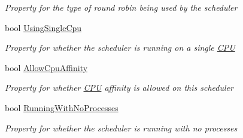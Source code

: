 \begin{DoxyCompactItemize}
\begin{DoxyCompactList}\small\item\em Property for the type of round robin being used by the scheduler \end{DoxyCompactList}\item 
bool \hyperlink{class_c_p_u___o_s___simulator_1_1_operating___system_1_1_scheduler_a3637999160bc25da430731042f42dd81}{Using\+Single\+Cpu}
\begin{DoxyCompactList}\small\item\em Property for whether the scheduler is running on a single \hyperlink{namespace_c_p_u___o_s___simulator_1_1_c_p_u}{C\+P\+U} \end{DoxyCompactList}\item 
bool \hyperlink{class_c_p_u___o_s___simulator_1_1_operating___system_1_1_scheduler_a904a19345a3ceffa809aac3e0ad06321}{Allow\+Cpu\+Affinity}
\begin{DoxyCompactList}\small\item\em Property for whether \hyperlink{namespace_c_p_u___o_s___simulator_1_1_c_p_u}{C\+P\+U} affinity is allowed on this scheduler \end{DoxyCompactList}\item 
bool \hyperlink{class_c_p_u___o_s___simulator_1_1_operating___system_1_1_scheduler_a17ad8e2a5da8823a25da6fa4190f532d}{Running\+With\+No\+Processes}
\begin{DoxyCompactList}\small\item\em Property for whether the scheduler is running with no processes \end{DoxyCompactList}\end{DoxyCompactItemize}
